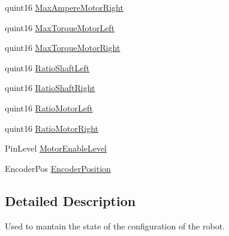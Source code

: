 \begin{DoxyCompactItemize}
\item 
quint16 \hyperlink{struct___robot_configuration_a42620d2d390b5647ad91080099804f24}{Max\-Ampere\-Motor\-Right}
\item 
quint16 \hyperlink{struct___robot_configuration_a5c556f8da91c14e17b2150f5b9a9ed26}{Max\-Torque\-Motor\-Left}
\item 
quint16 \hyperlink{struct___robot_configuration_a3d3d5e740395408ba0ee9d108c68fcb9}{Max\-Torque\-Motor\-Right}
\item 
quint16 \hyperlink{struct___robot_configuration_a79de71ac2a7be019acea88d1cb1c92cc}{Ratio\-Shaft\-Left}
\item 
quint16 \hyperlink{struct___robot_configuration_aef75f196a9ac7433f73b13c8be32ee50}{Ratio\-Shaft\-Right}
\item 
quint16 \hyperlink{struct___robot_configuration_a6e49cb2f07852f96c80c4466a20b4334}{Ratio\-Motor\-Left}
\item 
quint16 \hyperlink{struct___robot_configuration_ac89f6df8e7eb18f6535a2f46c6ff2895}{Ratio\-Motor\-Right}
\item 
Pin\-Level \hyperlink{struct___robot_configuration_a44c8ef3ff07fc7f7c00489b76c73e738}{Motor\-Enable\-Level}
\item 
Encoder\-Pos \hyperlink{struct___robot_configuration_a5a5010ca51d595bec652a274216e8d8e}{Encoder\-Position}
\end{DoxyCompactItemize}


\subsection{Detailed Description}
Used to mantain the state of the configuration of the robot. 

